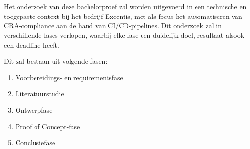 
\chapter{}%
\label{ch:methodologie}




Het onderzoek van deze bachelorproef zal worden uitgevoerd in een technische en toegepaste context bij het bedrijf Excentis, met als focus het automatiseren van CRA-compliance aan de hand van CI/CD-pipelines. Dit onderzoek zal in verschillende fases verlopen, waarbij elke fase een duidelijk doel, resultaat alsook een deadline heeft.

Dit zal bestaan uit volgende fasen:
\begin{enumerate}
    \item Voorbereidings- en requirementsfase
    \item Literatuurstudie
    \item Ontwerpfase
    \item Proof of Concept-fase
    \item Conclusiefase
\end{enumerate}

